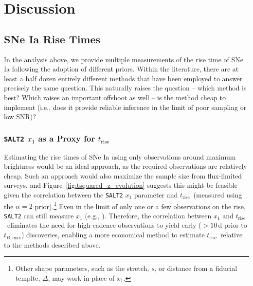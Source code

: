 \documentclass[twocolumn]{./aastex63}
\newcommand{\trise}{$t_\mathrm{rise}$}
\newcommand{\tbmax}{$t_{B,\mathrm{max}}$}
\begin{document}
\section{Discussion}

\subsection{SNe Ia Rise Times}

In the analysis above, we provide multiple measurements of the rise time of SNe
Ia following the adoption of different priors. Within the literature, there are
at least a half dozen entirely different methods that have been employed to
answer precisely the same question. This naturally raises the question -- which
method is best? Which raises an important offshoot as well -- is the method
cheap to implement (i.e., does it provide reliable inference in the limit of
poor sampling or low SNR)?

\subsubsection{\texttt{SALT2} $x_1$ as a Proxy for \trise}\label{sec:x1_rise}

Estimating the rise times of SNe Ia using only observations around maximum
brightness would be an ideal approach, as the required observations are
relatively cheap. Such an approach would also maximize the sample size from
flux-limited surveys, and Figure~\ref{fig:tsquared_z_evolution} suggests this
might be feasible given the correlation between the \texttt{SALT2} $x_1$
parameter and \trise\ (measured using the $\alpha = 2$ prior).\footnote{Other
shape parameters, such as the stretch, $s$, or distance from a fiducial
templte, $\Delta$, may work in place of $x_1$.} Even in the limit of only one
or a few observations on the rise, \texttt{SALT2} can still measure $x_1$
(e.g., \citealt{Scolnic18a}). Therefore, the correlation between $x_1$ and
\trise\ eliminates the need for high-cadence observations to yield early ($>
10$\,d prior to \tbmax) discoveries, enabling a more economical method to
estimate \trise\ relative to the methods described above.
\end{document}
